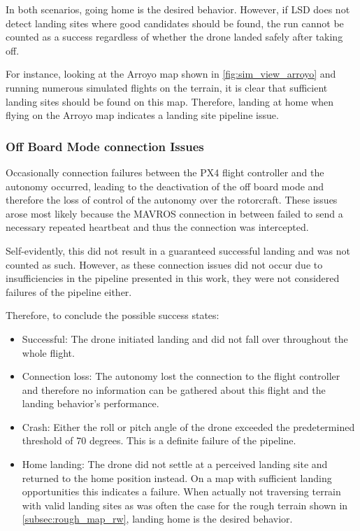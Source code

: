    In both scenarios, going home is the desired behavior. However, if LSD does not detect landing sites where good candidates should be found, the run cannot be counted as a success regardless of whether the drone landed safely after taking off.

    For instance, looking at the Arroyo map shown in \cref{fig:sim_view_arroyo} and running numerous simulated flights on the terrain, it is clear that sufficient landing sites should be found on this map. Therefore, landing at home when flying on the Arroyo map indicates a landing site pipeline issue.
\subsubsection{Off Board Mode connection Issues}
Occasionally connection failures between the PX4 flight controller and the autonomy occurred, leading to the deactivation of the off board mode and therefore the loss of control of the autonomy over the rotorcraft. These issues arose most likely because the MAVROS connection in between failed to send a necessary repeated heartbeat and thus the connection was intercepted.

Self-evidently, this did not result in a guaranteed successful landing and was not counted as such. However, as these connection issues did not occur due to insufficiencies in the pipeline presented in this work, they were not considered failures of the pipeline either. 

Therefore, to conclude the possible success states:

\begin{itemize}
    \item Successful: The drone initiated landing and did not fall over throughout the whole flight.
    \item Connection loss: The autonomy lost the connection to the flight controller and therefore no information can be gathered about this flight and the landing behavior's performance.
    \item Crash: Either the roll or pitch angle of the drone exceeded the predetermined threshold of 70 degrees. This is a definite failure of the pipeline.
    \item Home landing: The drone did not settle at a perceived landing site and returned to the home position instead. On a map with sufficient landing opportunities this indicates a failure. When actually not traversing terrain with valid landing sites as was often the case for the rough terrain shown in \cref{subsec:rough_map_rw}, landing home is the desired behavior.
\end{itemize}
\clearpage


